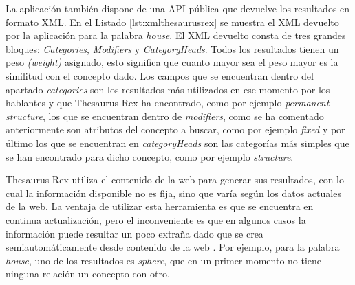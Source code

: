 La aplicación también dispone de una API pública que devuelve los resultados en formato XML.
En el Listado \ref{lst:xmlthesaurusrex} se muestra el XML devuelto por la aplicación para la palabra \textit{house}. El XML devuelto consta de tres grandes bloques: \textit{Categories}, \textit{Modifiers} y \textit{CategoryHeads}. Todos los resultados tienen un peso \textit{(weight)} asignado, esto significa que cuanto mayor sea el peso mayor es la similitud con el concepto dado. 
Los campos que se encuentran dentro del apartado \textit{categories} son los resultados más utilizados en ese momento por los hablantes y que Thesaurus Rex ha encontrado, como por ejemplo \textit{permanent-structure}, los que se encuentran dentro de  \textit{modifiers}, como se ha comentado anteriormente son atributos del concepto a buscar, como por ejemplo \textit{fixed}  y por último los que se encuentran en \textit{categoryHeads} son las categorías más simples que se han encontrado para dicho concepto, como por ejemplo \textit{structure}.

Thesaurus Rex utiliza el contenido de la web para generar sus resultados, con lo cual la información disponible no es fija, sino que varía según los datos actuales de la web.
La ventaja de utilizar esta herramienta es que se encuentra en continua actualización, pero el inconveniente es que en algunos casos la información puede resultar un poco extraña dado que se crea semiautomáticamente desde contenido de la web \citep{VealeT2013}. Por ejemplo, para la palabra \textit{house}, uno de los resultados es \textit{sphere}, que en un primer momento no tiene ninguna relación un concepto con otro.

